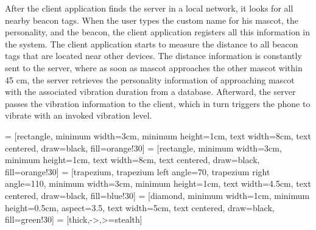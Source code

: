 After the client application finds the server in a local network, it looks for all nearby beacon tags.
When the user types the custom name for his mascot, the personality, and the beacon, the client
application registers all this information in the system.
The client application starts to measure the distance to all beacon tags that are located near other devices.
The distance information is constantly sent to the server, where as soon as mascot approaches the other mascot within
45 cm, the server retrieves the personality information of approaching mascot with the associated vibration duration
from a database.
Afterward, the server passes the vibration information to the client, which in turn triggers the
phone to vibrate with an invoked vibration level.

 = [rectangle, minimum width=3cm, minimum height=1cm,
text width=8cm, text centered, draw=black, fill=orange!30]
 = [rectangle, minimum width=3cm, minimum height=1cm,
text width=8cm, text centered, draw=black, fill=orange!30]
 = [trapezium, trapezium left angle=70, trapezium right angle=110, minimum width=3cm, minimum height=1cm,
text width=4.5cm, text centered, draw=black, fill=blue!30]
 = [diamond, minimum width=1cm, minimum height=0.5cm, aspect=3.5,
text width=5cm, text centered, draw=black, fill=green!30]
 = [thick,->,>=stealth]
